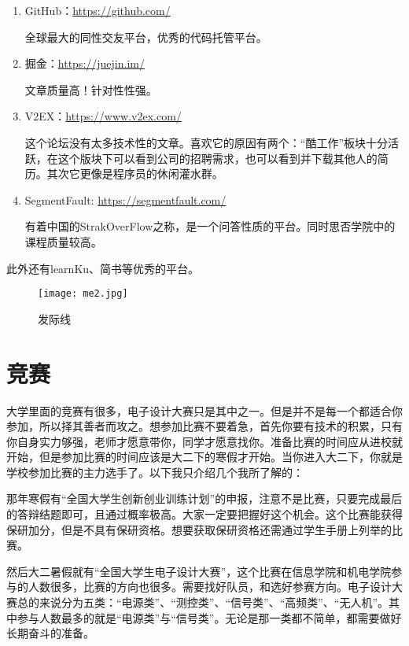 \documentclass[cn,11pt]{elegantbook}
\begin{document}
\begin{enumerate}
\item GitHub：\href{https://github.com/}{https://github.com/} 

全球最大的同性交友平台，优秀的代码托管平台。
	
\item 掘金：\href{https://juejin.im/}{https://juejin.im/} 

文章质量高！针对性性强。

\item V2EX：\href{https://www.v2ex.com/}{https://www.v2ex.com/} 

这个论坛没有太多技术性的文章。喜欢它的原因有两个：“酷工作”板块十分活跃，在这个版块下可以看到公司的招聘需求，也可以看到并下载其他人的简历。其次它更像是程序员的休闲灌水群。

\item SegmentFault: \href{https://segmentfault.com/}{https://segmentfault.com/} 

有着中国的StrakOverFlow之称，是一个问答性质的平台。同时思否学院中的课程质量较高。

\end{enumerate}	
此外还有learnKu、简书等优秀的平台。


\begin{figure}[htbp]
	\centering
	\texttt{[image: me2.jpg]}
	\caption{ 发际线 \label{fig:scatter}}
\end{figure}

\section{竞赛}

大学里面的竞赛有很多，电子设计大赛只是其中之一。但是并不是每一个都适合你参加，所以择其善者而攻之。想参加比赛不要着急，首先你要有技术的积累，只有你自身实力够强，老师才愿意带你，同学才愿意找你。准备比赛的时间应从进校就开始，但是参加比赛的时间应该是大二下的寒假才开始。当你进入大二下，你就是学校参加比赛的主力选手了。以下我只介绍几个我所了解的：

那年寒假有“全国大学生创新创业训练计划”的申报，注意不是比赛，只要完成最后的答辩结题即可，且通过概率极高。大家一定要把握好这个机会。这个比赛能获得保研加分，但是不具有保研资格。想要获取保研资格还需通过学生手册上列举的比赛。

然后大二暑假就有“全国大学生电子设计大赛”，这个比赛在信息学院和机电学院参与的人数很多，比赛的方向也很多。需要找好队员，和选好参赛方向。电子设计大赛总的来说分为五类：“电源类”、“测控类”、“信号类”、“高频类”、“无人机”。其中参与人数最多的就是“电源类”与“信号类”。无论是那一类都不简单，都需要做好长期奋斗的准备。
\end{document}
